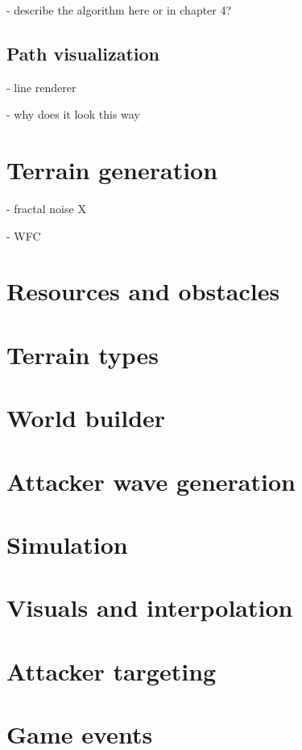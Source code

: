 - describe the algorithm here or in chapter 4?

\subsection{Path visualization}

- line renderer \checkmark

- why does it look this way

\section{Terrain generation}

- fractal noise X

- WFC \checkmark

\section{Resources and obstacles}

\section{Terrain types}

\section{World builder}

\section{Attacker wave generation}

\section{Simulation}

\section{Visuals and interpolation}

\section{Attacker targeting}

\section{Game events}

